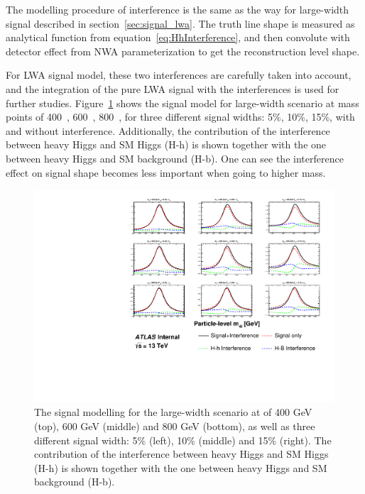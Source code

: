 The modelling procedure of interference is the same as the way for large-width signal described in section~\ref{sec:signal_lwa}.
The truth line shape is measured as analytical function from equation~\ref{eq:HhInterference}, and then convolute with detector effect from NWA parameterization to get the reconstruction level shape.

For LWA signal model, these two interferences are carefully taken into account, and the integration of the pure LWA signal with the interferences is used for further studies.
Figure~\ref{fig:LWASignalModel} shows the signal model for large-width scenario at mass points of 400~\gev, 600~\gev, 800~\gev, for three different signal widths: 5\%, 10\%, 15\%, with and without interference.
Additionally, the contribution of the interference between heavy Higgs and SM Higgs (H-h) is shown together with the one between heavy Higgs and SM \ggZZ background (H-b).
One can see the interference effect on signal shape becomes less important when going to higher mass.

\begin{figure}[htbp]
    \centering
    \includegraphics[width=1.0\textwidth]{figures/HMHZZ/signal/LWA/LWAModel.pdf}
    \caption{The signal modelling for the large-width scenario at \mH of 400 GeV (top), 600 GeV (middle) and 800 GeV (bottom), as well as three different signal width:  5\%  (left), 10\%  (middle) and 15\% (right). 
    The contribution of the interference between heavy Higgs and SM Higgs (H-h) is shown together with the one between heavy Higgs and SM \ggZZ background (H-b).}
    \label{fig:LWASignalModel}
\end{figure}


